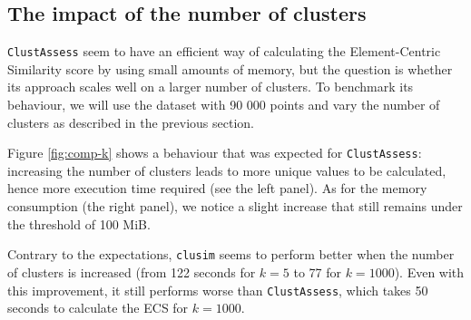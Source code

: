 \begin{table}[]

\caption{\label{tab:comp-mem} Memory consumption of ClustAssess and clusim on datasets with various sizes, measured in GiB.}
\end{table}

\subsection{The impact of the number of clusters}
\verb|ClustAssess| seem to have an efficient way of calculating the Element-Centric Similarity score by using small amounts of memory, but the question is whether its approach scales well on a larger number of clusters. To benchmark its behaviour, we will use the dataset with 90 000 points and vary the number of clusters as described in the previous section.

Figure \ref{fig:comp-k} shows a behaviour that was expected for \verb|ClustAssess|: increasing the number of clusters leads to more unique values to be calculated, hence more execution time required (see the left panel). As for the memory consumption (the right panel), we notice a slight increase that still remains under the threshold of 100 MiB.

Contrary to the expectations, \verb|clusim| seems to perform better when the number of clusters is increased (from 122 seconds for $k = 5$ to 77 for $k = 1000$). Even with this improvement, it still performs worse than \verb|ClustAssess|, which takes 50 seconds to calculate the ECS for $k = 1000$.

